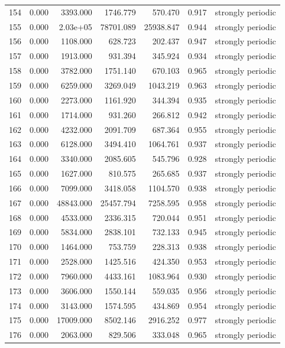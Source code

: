 \begin{longtable}{lrrrrrl}
154 & 0.000 & 3393.000 & 1746.779 & 570.470 & 0.917 & strongly periodic \\
155 & 0.000 & 2.03e+05 & 78701.089 & 25938.847 & 0.944 & strongly periodic \\
156 & 0.000 & 1108.000 & 628.723 & 202.437 & 0.947 & strongly periodic \\
157 & 0.000 & 1913.000 & 931.394 & 345.924 & 0.934 & strongly periodic \\
158 & 0.000 & 3782.000 & 1751.140 & 670.103 & 0.965 & strongly periodic \\
159 & 0.000 & 6259.000 & 3269.049 & 1043.219 & 0.963 & strongly periodic \\
160 & 0.000 & 2273.000 & 1161.920 & 344.394 & 0.935 & strongly periodic \\
161 & 0.000 & 1714.000 & 931.260 & 266.812 & 0.942 & strongly periodic \\
162 & 0.000 & 4232.000 & 2091.709 & 687.364 & 0.955 & strongly periodic \\
163 & 0.000 & 6128.000 & 3494.410 & 1064.761 & 0.937 & strongly periodic \\
164 & 0.000 & 3340.000 & 2085.605 & 545.796 & 0.928 & strongly periodic \\
165 & 0.000 & 1627.000 & 810.575 & 265.685 & 0.937 & strongly periodic \\
166 & 0.000 & 7099.000 & 3418.058 & 1104.570 & 0.938 & strongly periodic \\
167 & 0.000 & 48843.000 & 25457.794 & 7258.595 & 0.958 & strongly periodic \\
168 & 0.000 & 4533.000 & 2336.315 & 720.044 & 0.951 & strongly periodic \\
169 & 0.000 & 5834.000 & 2838.101 & 732.133 & 0.945 & strongly periodic \\
170 & 0.000 & 1464.000 & 753.759 & 228.313 & 0.938 & strongly periodic \\
171 & 0.000 & 2528.000 & 1425.516 & 424.350 & 0.953 & strongly periodic \\
172 & 0.000 & 7960.000 & 4433.161 & 1083.964 & 0.930 & strongly periodic \\
173 & 0.000 & 3606.000 & 1550.144 & 559.035 & 0.956 & strongly periodic \\
174 & 0.000 & 3143.000 & 1574.595 & 434.869 & 0.954 & strongly periodic \\
175 & 0.000 & 17009.000 & 8502.146 & 2916.252 & 0.977 & strongly periodic \\
176 & 0.000 & 2063.000 & 829.506 & 333.048 & 0.965 & strongly periodic \\

\end{longtable}
